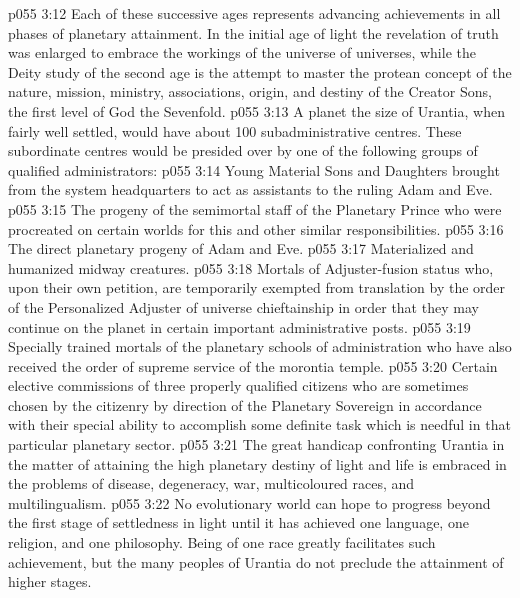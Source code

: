 \vs p055 3:12 Each of these successive ages represents advancing achievements in all phases of planetary attainment. In the initial age of light the revelation of truth was enlarged to embrace the workings of the universe of universes, while the Deity study of the second age is the attempt to master the protean concept of the nature, mission, ministry, associations, origin, and destiny of the Creator Sons, the first level of God the Sevenfold.
\vs p055 3:13 \pc A planet the size of Urantia, when fairly well settled, would have about 100 subadministrative centres. These subordinate centres would be presided over by one of the following groups of qualified administrators:
\vs p055 3:14 \bibnobreakspace Young Material Sons and Daughters brought from the system headquarters to act as assistants to the ruling Adam and Eve.
\vs p055 3:15 \bibnobreakspace The progeny of the semimortal staff of the Planetary Prince who were procreated on certain worlds for this and other similar responsibilities.
\vs p055 3:16 \bibnobreakspace The direct planetary progeny of Adam and Eve.
\vs p055 3:17 \bibnobreakspace Materialized and humanized midway creatures.
\vs p055 3:18 \bibnobreakspace Mortals of Adjuster\hyp{}fusion status who, upon their own petition, are temporarily exempted from translation by the order of the Personalized Adjuster of universe chieftainship in order that they may continue on the planet in certain important administrative posts.
\vs p055 3:19 \bibnobreakspace Specially trained mortals of the planetary schools of administration who have also received the order of supreme service of the morontia temple.
\vs p055 3:20 \bibnobreakspace Certain elective commissions of three properly qualified citizens who are sometimes chosen by the citizenry by direction of the Planetary Sovereign in accordance with their special ability to accomplish some definite task which is needful in that particular planetary sector.
\vs p055 3:21 \pc The great handicap confronting Urantia in the matter of attaining the high planetary destiny of light and life is embraced in the problems of disease, degeneracy, war, multicoloured races, and multilingualism.
\vs p055 3:22 No evolutionary world can hope to progress beyond the first stage of settledness in light until it has achieved one language, one religion, and one philosophy. Being of one race greatly facilitates such achievement, but the many peoples of Urantia do not preclude the attainment of higher stages.
